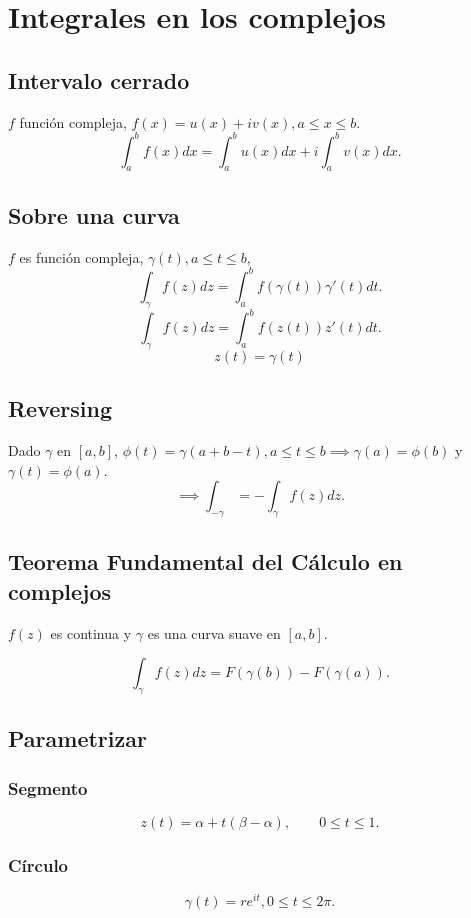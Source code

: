 




\section{Integrales en los complejos}

\subsection{Intervalo cerrado}
$f$ función compleja, $f(x)=u(x)+iv(x), a\leq x\leq b$.  
$$\int_{a}^{b} f(x) dx = \int_a^b u(x)dx+i\int_{a}^{b}v(x)dx.$$
\subsection{Sobre una curva}
$f$ es función compleja, $\gamma(t), a\leq t \leq b$, 
$$\int_\gamma f(z)dz=\int_a^b f(\gamma(t))\gamma'(t)dt.$$
$$\int_\gamma f(z)dz=\int_a^b f(z(t))z'(t)dt.$$
$$z(t)=\gamma (t)$$
\subsection{Reversing}
Dado $\gamma$ en $[a,b]$, $\phi(t)=\gamma (a+b-t), a\leq t\leq b \implies \gamma(a)=\phi (b)$ y $\gamma (t)=\phi(a)$. 
$$\implies \int_{-\gamma }=-\int_\gamma f(z)dz.$$

\subsection{Teorema Fundamental del Cálculo en complejos}
$f(z)$ es continua y $\gamma$ es una curva suave en $[a,b]$. 

$$\int_\gamma f(z)dz=F(\gamma(b))-F(\gamma(a)).$$

\subsection{Parametrizar}
\subsubsection{Segmento}
$$z(t)=\alpha +t(\beta-\alpha ), \qquad 0\leq t\leq 1.$$

\subsubsection{Círculo}
$$\gamma(t) = re^{it}, 0\leq t\leq 2\pi. $$

